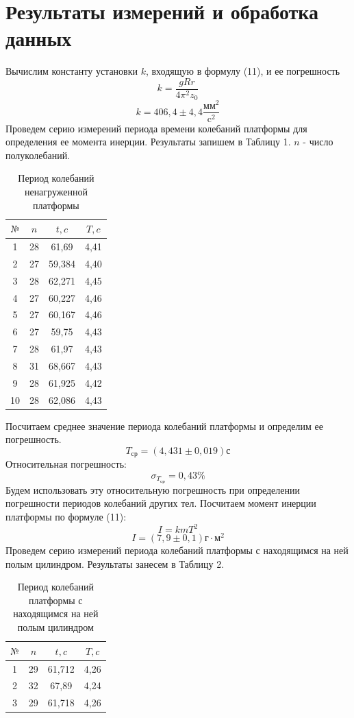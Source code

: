 \documentclass[a4paper,12pt]{article} %
\begin{document}
\section{Результаты измерений и обработка данных}
Вычислим константу установки $k$, входящую в формулу (11), и ее погрешность
\[k = \frac{gRr}{4\pi^2z_0}\]
\[k = 406,4\pm 4,4\frac{\text{мм}^2}{\text{c}^2}\]
Проведем серию измерений периода времени колебаний платформы для определения ее момента инерции. Результаты запишем в Таблицу 1. $n$ - число полуколебаний.
\newpage
\begin{table}[h]
\centering
\begin{tabular}{|c|c|c|c|}
\hline
$\text{№}$ & $n$  & $t, c$ & $T, c$       \\ \hline
1  & 28   & 61,69  & 4,41 \\ \hline
2  & 27   & 59,384 & 4,40 \\ \hline
3  & 28   & 62,271 & 4,45 \\ \hline
4  & 27   & 60,227 & 4,46 \\ \hline
5  & 27   & 60,167 & 4,46 \\ \hline
6  & 27   & 59,75  & 4,43 \\ \hline
7  & 28   & 61,97  & 4,43 \\ \hline
8  & 31   & 68,667 & 4,43 \\ \hline
9  & 28   & 61,925 & 4,42 \\ \hline
10 & 28   & 62,086 & 4,43 \\ \hline
\end{tabular}
\caption{Период колебаний ненагруженной платформы}
\end{table}
Посчитаем среднее значение периода колебаний платформы и определим ее погрешность.
\[T_\text{ср} = (4,431\pm0,019)\text{с}\]
Относительная погрешность:
\[\sigma_{T_\text{ср}} = 0,43\%\]
Будем использовать эту относительную погрешность при определении погрешности периодов колебаний других тел.
Посчитаем момент инерции платформы по формуле (11):
\[I = kmT^2\]
\[I = (7,9\pm0,1)\text{г}\cdot \text{м}^2\]
Проведем серию измерений периода колебаний платформы с находящимся на ней полым цилиндром. Результаты занесем в Таблицу 2.
\begin{table}[h]
\centering
\begin{tabular}{|c|c|c|c|}
\hline
$\text{№}$ & $n$  & $t, c$ & $T, c$   \\ \hline
1 & 29 & 61,712 & 4,26 \\ \hline
2 & 32 & 67,89  & 4,24 \\ \hline
3 & 29 & 61,718 & 4,26 \\ \hline
\end{tabular}
\caption{Период колебаний платформы с находящимся на ней полым цилиндром}
\end{table}
\end{document}

